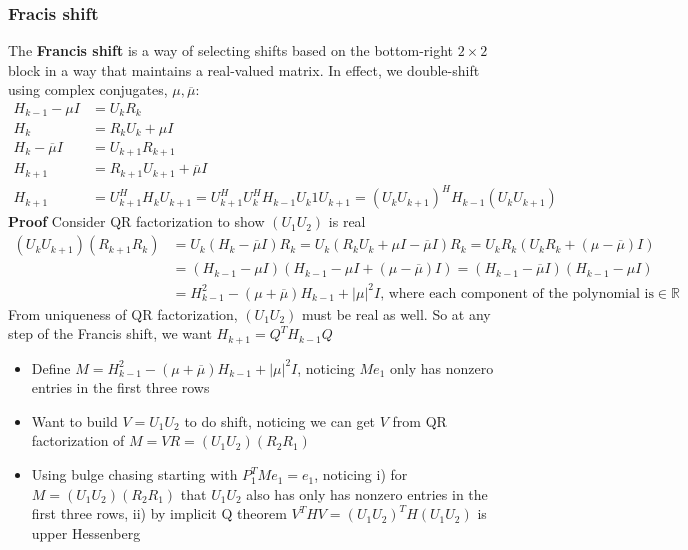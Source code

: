 \documentclass{article}
\newcommand{\abs}[1]{\lvert#1\rvert}
\begin{document}
\subsubsection{Fracis shift}
The \textbf{Francis shift} is a way of selecting shifts based on the bottom-right $2\times 2$ block in a way that maintains a real-valued matrix. In effect, we double-shift using complex conjugates, $\mu, \overline{\mu}$:
\begin{align*}
    H_{k-1} - \mu I &= U_kR_k\\
    H_k &= R_kU_k + \mu I\\
    H_k - \overline{\mu}I &= U_{k+1}R_{k+1}\\
    H_{k+1} &= R_{k+1}U_{k+1} + \overline{\mu}I\\
    H_{k+1} &= U^H_{k+1}H_kU_{k+1} = U^H_{k+1}U^H_kH_{k-1}U_k1U_{k+1} = (U_kU_{k+1})^HH_{k-1}(U_kU_{k+1})
\end{align*}
\textbf{Proof} Consider QR factorization to show $(U_1U_2)$ is real
\begin{align*}
    (U_kU_{k+1})(R_{k+1}R_k) &= U_k(H_k - \overline{\mu}I)R_k = U_k(R_kU_k + \mu I - \overline{\mu}I)R_k = U_kR_k(U_kR_k + (\mu - \overline{\mu})I)\\
    &= (H_{k-1} - \mu I)(H_{k-1} - \mu I + (\mu - \overline{\mu})I) = (H_{k-1} - \overline{\mu}I)(H_{k-1} - \mu I)\\
    &= H_{k-1}^2 - (\mu + \overline{\mu})H_{k-1} + \abs{\mu}^2I \textrm{, where each component of the polynomial is} \in \mathbb{R}
\end{align*}
From uniqueness of QR factorization, $(U_1U_2)$ must be real as well. So at any step of the Francis shift, we want $H_{k+1} = Q^TH_{k-1}Q$
\begin{itemize}
    \item Define $M = H_{k-1}^2 - (\mu + \overline{\mu})H_{k-1} + \abs{\mu}^2I$, noticing $Me_1$ only has nonzero entries in the first three rows
    \item Want to build $V = U_1U_2$ to do shift, noticing we can get $V$ from QR factorization of $M = VR = (U_1U_2)(R_2R_1)$
    \item Using bulge chasing starting with $P_1^TMe_1 = e_1$, noticing i) for $M = (U_1U_2)(R_2R_1)$ that $U_1U_2$ also has only has nonzero entries in the first three rows, ii) by implicit Q theorem $V^THV = (U_1U_2)^TH(U_1U_2)$ is upper Hessenberg
\end{itemize}
\end{document}
